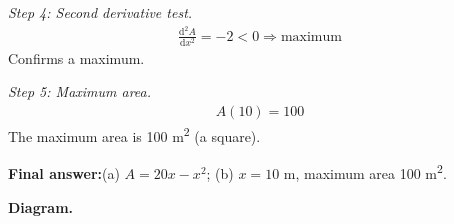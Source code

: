 \documentclass[11pt]{article}
\begin{document}
\textit{Step 4: Second derivative test.}
\[\begin{gathered}
\frac{\mathrm{d}^2A}{\mathrm{d}x^2} = -2 < 0 \Rightarrow \text{maximum}
\end{gathered}\]
Confirms a maximum.

\textit{Step 5: Maximum area.}
\[\begin{gathered}
A(10) = 100
\end{gathered}\]
The maximum area is 100 m\textsuperscript{2} (a square).

\begin{answerbox}
\textbf{Final answer:}\quad (a) \(\displaystyle  A = 20x - x^2 \); (b) \(\displaystyle  x = 10 \) m, maximum area 100 m\textsuperscript{2}.
\end{answerbox}
\textbf{Diagram.}

\begin{center}
\end{center}
\end{document}
